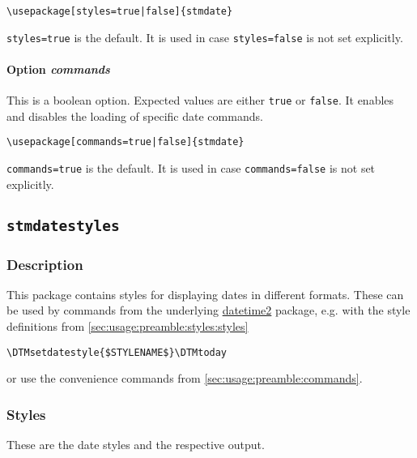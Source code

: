 \documentclass{scrartcl}
\begin{document}
\begin{verbatim}
\usepackage[styles=true|false]{stmdate}
\end{verbatim}

\texttt{styles=true} is the default. It is used in case \texttt{styles=false} is not set explicitly.

\paragraph{Option \protect\textit{commands}} 
\label{sec:usage:preamble:wholepackage:options:commands}

This is a boolean option. Expected values are either \texttt{true} or \texttt{false}. It enables and disables the loading of specific date commands.

\begin{verbatim}
\usepackage[commands=true|false]{stmdate}
\end{verbatim}

\texttt{commands=true} is the default. It is used in case \texttt{commands=false} is not set explicitly.

\subsection{\protect\texttt{stmdatestyles}}
\label{sec:usage:preamble:styles}

\subsubsection{Description}
\label{sec:usage:preamble:styles:description}

This package contains styles for displaying dates in different formats. These can be used by commands from the underlying \href{https://ctan.org/pkg/datetime2}{datetime2} package, e.g. with the style definitions from \autoref{sec:usage:preamble:styles:styles}

\begin{verbatim}
\DTMsetdatestyle{$STYLENAME$}\DTMtoday
\end{verbatim}

or use the convenience commands from \autoref{sec:usage:preamble:commands}.

\subsubsection{Styles}
\label{sec:usage:preamble:styles:styles}

These are the date styles and the respective output.
\end{document}
